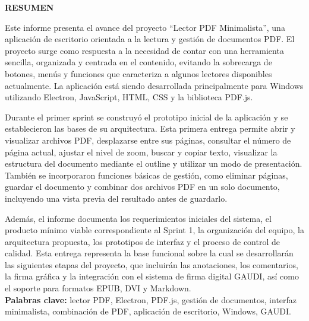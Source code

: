 \begin{center}
\thispagestyle{empty}
\vspace{2cm}
\LARGE{\textbf{RESUMEN}}\\[1.0cm]
\end{center}
\thispagestyle{empty}

Este informe presenta el avance del proyecto “Lector PDF Minimalista”, una aplicación de escritorio orientada a la lectura y gestión de documentos PDF. El proyecto surge como respuesta a la necesidad de contar con una herramienta sencilla, organizada y centrada en el contenido, evitando la sobrecarga de botones, menús y funciones que caracteriza a algunos lectores disponibles actualmente. La aplicación está siendo desarrollada principalmente para Windows utilizando Electron, JavaScript, HTML, CSS y la biblioteca PDF.js.

Durante el primer sprint se construyó el prototipo inicial de la aplicación y se establecieron las bases de su arquitectura. Esta primera entrega permite abrir y visualizar archivos PDF, desplazarse entre sus páginas, consultar el número de página actual, ajustar el nivel de zoom, buscar y copiar texto, visualizar la estructura del documento mediante el outline y utilizar un modo de presentación. También se incorporaron funciones básicas de gestión, como eliminar páginas, guardar el documento y combinar dos archivos PDF en un solo documento, incluyendo una vista previa del resultado antes de guardarlo.

Además, el informe documenta los requerimientos iniciales del sistema, el producto mínimo viable correspondiente al Sprint 1, la organización del equipo, la arquitectura propuesta, los prototipos de interfaz y el proceso de control de calidad. Esta entrega representa la base funcional sobre la cual se desarrollarán las siguientes etapas del proyecto, que incluirán las anotaciones, los comentarios, la firma gráfica y la integración con el sistema de firma digital GAUDI, así como el soporte para formatos EPUB, DVI y Markdown. \\

\textbf{Palabras clave: }lector PDF, Electron, PDF.js, gestión de documentos, interfaz minimalista, combinación de PDF, aplicación de escritorio, Windows, GAUDI.